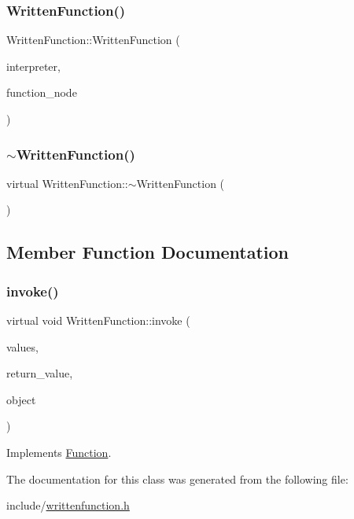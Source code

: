 \subsubsection{\texorpdfstring{Written\+Function()}{WrittenFunction()}}
{\footnotesize\ttfamily Written\+Function\+::\+Written\+Function (\begin{DoxyParamCaption}\item[{\hyperlink{classInterpreter}{Interpreter} $\ast$}]{interpreter,  }\item[{\hyperlink{classFunctionNode}{Function\+Node} $\ast$}]{function\+\_\+node }\end{DoxyParamCaption})}

\mbox{\label{classWrittenFunction_a46facc10f998146c7709772b0b662ad6}} 
\subsubsection{\texorpdfstring{$\sim$\+Written\+Function()}{~WrittenFunction()}}
{\footnotesize\ttfamily virtual Written\+Function\+::$\sim$\+Written\+Function (\begin{DoxyParamCaption}{ }\end{DoxyParamCaption})\hspace{0.3cm}{\ttfamily [virtual]}}



\subsection{Member Function Documentation}
\mbox{\label{classWrittenFunction_afe56e5eb6a13f6e38ab5ec87e371d745}} 
\subsubsection{\texorpdfstring{invoke()}{invoke()}}
{\footnotesize\ttfamily virtual void Written\+Function\+::invoke (\begin{DoxyParamCaption}\item[{std\+::vector$<$ \hyperlink{classValue}{Value} $>$}]{values,  }\item[{\hyperlink{classValue}{Value} $\ast$}]{return\+\_\+value,  }\item[{std\+::shared\+\_\+ptr$<$ \hyperlink{classObject}{Object} $>$}]{object }\end{DoxyParamCaption})\hspace{0.3cm}{\ttfamily [virtual]}}



Implements \hyperlink{classFunction_a84f9a63e68becc27e58ea738ba4cd698}{Function}.



The documentation for this class was generated from the following file\+:\begin{DoxyCompactItemize}
\item 
include/\hyperlink{writtenfunction_8h}{writtenfunction.\+h}\end{DoxyCompactItemize}

